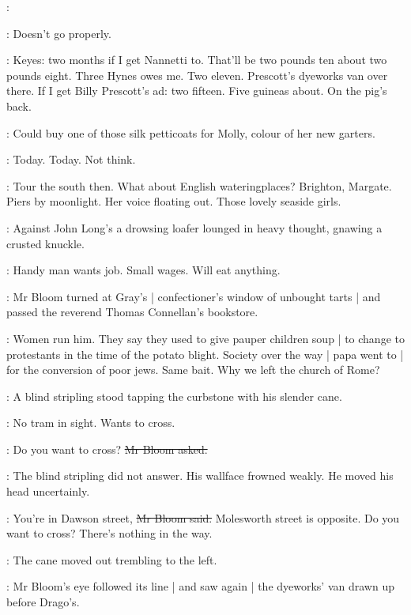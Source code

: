 \BloomInt:

\BloomInt:
Doesn't go properly.

\BloomInt:
Keyes: two months if I get Nannetti to.
That'll be two pounds ten
about two pounds eight.
Three Hynes owes me.
Two eleven.
Prescott's dyeworks van over there.
If I get Billy Prescott's ad:
two fifteen.
Five guineas about.
On the pig's back.

\BloomInt:
Could buy one of those silk petticoats for Molly,
colour of her new garters.

\BloomInt:
Today.
Today.
Not think.

\BloomInt:
Tour the south then.
What about English wateringplaces?
Brighton, Margate.
Piers by moonlight.
Her voice floating out.
Those lovely seaside girls.

:
Against John Long's
a drowsing loafer lounged in heavy thought,
gnawing a crusted knuckle.

\BloomInt:
Handy man wants job.
Small wages.
Will eat anything.

:
Mr Bloom turned at Gray's |
confectioner's window of unbought tarts |
and passed the reverend Thomas Connellan's bookstore.

\BloomInt:
Women run him.
They say they used to give pauper children soup |
to change to protestants in the time of the potato blight.
Society over the way |
papa went to |
for the conversion of poor jews.
Same bait.
Why we left the church of Rome?

:
A blind stripling stood tapping the curbstone with his slender cane.

\BloomInt:
No tram in sight.
Wants to cross.

\Bloom:
Do you want to cross?
\sout{Mr Bloom asked.}

:
The blind stripling did not answer.
His wallface frowned weakly.
He moved his head uncertainly.

\Bloom:
You're in Dawson street,
\sout{Mr Bloom said.}
Molesworth street is opposite.
Do you want to cross?
There's nothing in the way.

:
The cane moved out trembling to the left.

:
Mr Bloom's eye followed its line |
and saw again |
the dyeworks' van drawn up before Drago's.

